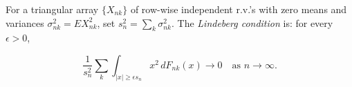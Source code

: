 For a triangular array $\{X_{nk}\}$ of row-wise independent r.v.'s with zero means and variances $\sigma_{nk}^2 = E X_{nk}^2$, set $s_n^2 = \sum_k \sigma_{nk}^2$. The \textit{Lindeberg condition} is: for every $\epsilon > 0$,

$$\frac{1}{s_n^2} \sum_k \int_{|x| \geq \epsilon s_n} x^2 \, dF_{nk}(x) \to 0 \quad \text{as } n \to \infty.$$
